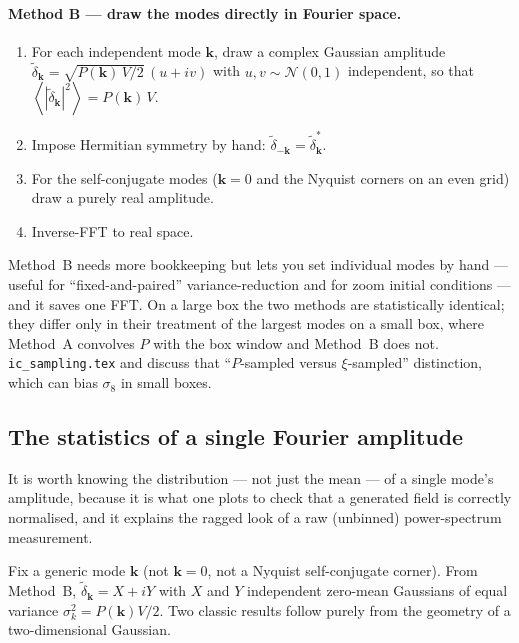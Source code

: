 \documentclass[12pt]{article}
\newcommand{\bk}{\mathbf{k}}
\newcommand{\avg}[1]{\left\langle #1 \right\rangle}
\newcommand{\code}[1]{\texttt{#1}}
\begin{document}
\paragraph{Method B --- draw the modes directly in Fourier space.}
\begin{enumerate}
  \item For each independent mode $\bk$, draw a complex Gaussian
        amplitude $\tilde\delta_\bk = \sqrt{P(\bk)\,V/2}\,(u + iv)$ with
        $u, v \sim \mathcal N(0,1)$ independent, so that
        $\avg{|\tilde\delta_\bk|^2} = P(\bk)\,V$.
  \item Impose Hermitian symmetry by hand:
        $\tilde\delta_{-\bk} = \tilde\delta_\bk^*$.
  \item For the self-conjugate modes ($\bk = 0$ and the Nyquist corners
        on an even grid) draw a purely real amplitude.
  \item Inverse-FFT to real space.
\end{enumerate}
Method~B needs more bookkeeping but lets you set individual modes by hand
--- useful for ``fixed-and-paired'' variance-reduction
\citep{AnguloPontzen2016} and for zoom initial conditions --- and it
saves one FFT.  On a large box the two methods are statistically
identical; they differ only in their treatment of the largest modes on a
small box, where Method~A convolves $P$ with the box window and Method~B
does not.  \code{ic\_sampling.tex} and \citet{Pen1997, Sirko2005} discuss
that ``$P$-sampled versus $\xi$-sampled'' distinction, which can bias
$\sigma_8$ in small boxes.

\subsection{The statistics of a single Fourier amplitude}
\label{sec:mode-stats}

It is worth knowing the distribution --- not just the mean --- of a
single mode's amplitude, because it is what one plots to check that a
generated field is correctly normalised, and it explains the ragged
look of a raw (unbinned) power-spectrum measurement.

Fix a generic mode $\bk$ (not $\bk=0$, not a Nyquist self-conjugate
corner).  From Method~B, $\tilde\delta_\bk = X + iY$ with $X$ and $Y$
independent zero-mean Gaussians of equal variance $\sigma_k^2 =
P(\bk)V/2$.  Two classic results follow purely from the geometry of a
two-dimensional Gaussian.
\end{document}

